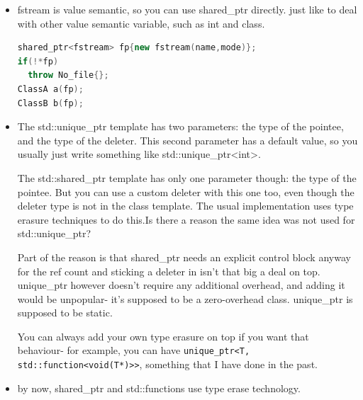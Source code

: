 \documentclass[a4paper,12pt,twoside]{book}
\begin{document}
\begin{itemize}
\item fstream is value semantic, so you can use shared\_ptr directly. just like to deal with other value semantic variable, such as int and class.
\begin{lstlisting}[frame=single, language=c++]
shared_ptr<fstream> fp{new fstream(name,mode)};
if(!*fp)
  throw No_file{};
ClassA a(fp);
ClassB b(fp);
\end{lstlisting}

\item The std::unique\_ptr template has two parameters: the type of the pointee, and the type of the deleter. This second parameter has a default value, so you usually just write something like std::unique\_ptr<int>.

The std::shared\_ptr template has only one parameter though: the type of the pointee. But you can use a custom deleter with this one too, even though the deleter type is not in the class template. The usual implementation uses type erasure techniques to do this.Is there a reason the same idea was not used for std::unique\_ptr?

Part of the reason is that shared\_ptr needs an explicit control block anyway for the ref count and sticking a deleter in isn't that big a deal on top. unique\_ptr however doesn't require any additional overhead, and adding it would be unpopular- it's supposed to be a zero-overhead class. unique\_ptr is supposed to be static.

You can always add your own type erasure on top if you want that behaviour- for example, you can have \texttt{unique\_ptr<T, std::function<void(T*)>>}, something that I have done in the past.

\item by now, shared\_ptr and std::functions use type erase technology. 

\end{itemize}
\end{document}

